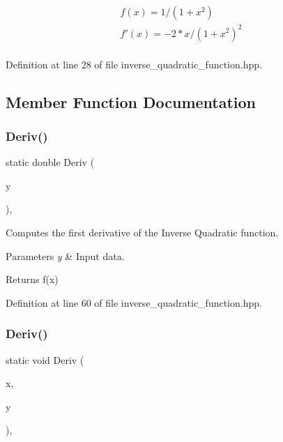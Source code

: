 \begin{eqnarray*} f(x) = 1 / (1 + x^2) \\ f'(x) = -2 * x / (1 + x^2)^2 \\ \end{eqnarray*} 

Definition at line 28 of file inverse\+\_\+quadratic\+\_\+function.\+hpp.



\subsection{Member Function Documentation}
\mbox{\label{classmlpack_1_1ann_1_1InvQuadFunction_a163d34fd09f8edf457164f5033c635cf}} 
\subsubsection{Deriv()\hspace{0.1cm}{\footnotesize\ttfamily [1/2]}}
{\footnotesize\ttfamily static double Deriv (\begin{DoxyParamCaption}\item[{const double}]{y }\end{DoxyParamCaption})\hspace{0.3cm}{\ttfamily [inline]}, {\ttfamily [static]}}



Computes the first derivative of the Inverse Quadratic function. 


\begin{DoxyParams}{Parameters}
{\em y} & Input data. \\
\hline
\end{DoxyParams}
\begin{DoxyReturn}{Returns}
f\textquotesingle{}(x) 
\end{DoxyReturn}


Definition at line 60 of file inverse\+\_\+quadratic\+\_\+function.\+hpp.

\mbox{\label{classmlpack_1_1ann_1_1InvQuadFunction_a0ad035ec996acd7025807d0e9e082887}} 
\subsubsection{Deriv()\hspace{0.1cm}{\footnotesize\ttfamily [2/2]}}
{\footnotesize\ttfamily static void Deriv (\begin{DoxyParamCaption}\item[{const Input\+Vec\+Type \&}]{x,  }\item[{Output\+Vec\+Type \&}]{y }\end{DoxyParamCaption})\hspace{0.3cm}{\ttfamily [inline]}, {\ttfamily [static]}}



